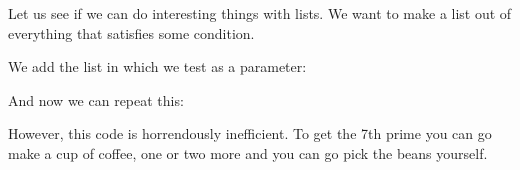 Let us see if we can do interesting things with lists. We want to make
a list out of everything that satisfies some condition.
\ndef{}
\begin{inputwithcode}
\def\ConsIf#1#2#3{#1{#2}{\Cons{#2}{#3}}{#3}}
\def\Doubles{\ListApply{\ConsIf{\DividesBy\Two}}\Nil\PositiveIntegers}
\def\AllSatisfy#1{\ListApply{\ConsIf{#1}}\Nil\PositiveIntegers}
\def\FirstSatisfy#1{\Head{\AllSatisfy{#1}}}
\end{inputwithcode}
\begin{logix}
\end{logix}
We add the list in which we test as a parameter:
\begin{inputwithcode}
\def\AllSatisfyIn#1#2{\ListApply{\ConsIf{#1}}\Nil{#2}}
\def\FirstSatisfyIn#1#2{\Head{\AllSatisfyIn{#1}{#2}}}
\end{inputwithcode}
\begin{logix}
\ttest{}{\FirstSatisfyIn
   {\NotDividesBy{\FirstSatisfyIn{\NotDividesBy\Two}\TwoOrMore}}
   {\AllSatisfyIn{\NotDividesBy\Two}\TwoOrMore}
   }
\end{logix}
And now we can repeat this:
\begin{inputwithcode}
\def\FilteredList#1{\AllSatisfyIn{\NotDividesBy{\Head{#1}}}{\Tail{#1}}}
\def\NthPrime#1{\Head{\PrimesFromNth{#1}}}
\def\PrimesFromNth#1{\IsOne{#1}\TwoOrMore
  {\FilteredList{\PrimesFromNth{\SubOne{#1}}}}}
\end{inputwithcode}
\begin{logix}
\end{logix}
However, this code is horrendously inefficient. To get the 7th prime
you can go make a cup of coffee, one or two more and you can go pick
the beans yourself.
\begin{inputwithcode}
\def\xFilteredList#1#2{\AllSatisfyIn{\NotDividesBy{#1}}{#2}}
\def\FilteredList#1{\xFilteredList{\Head{#1}}{\Tail{#1}}}
\end{inputwithcode}
\begin{logix}
\end{logix}


